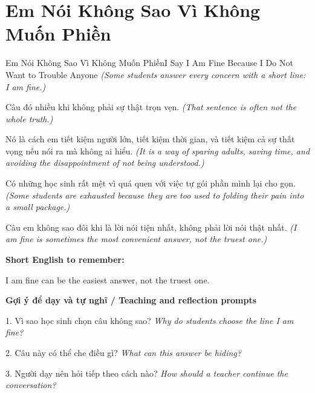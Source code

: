 \section{Em Nói Không Sao Vì Không Muốn Phiền}
\begin{truyen}{Em Nói Không Sao Vì Không Muốn Phiền}{I Say I Am Fine Because I Do Not Want to Trouble Anyone}
\textit{(Some students answer every concern with a short line: I am fine.)}

Câu đó nhiều khi không phải sự thật trọn vẹn.
\textit{(That sentence is often not the whole truth.)}

Nó là cách em tiết kiệm người lớn, tiết kiệm thời gian, và tiết kiệm cả sự thất vọng nếu nói ra mà không ai hiểu.
\textit{(It is a way of sparing adults, saving time, and avoiding the disappointment of not being understood.)}

Có những học sinh rất mệt vì quá quen với việc tự gói phần mình lại cho gọn.
\textit{(Some students are exhausted because they are too used to folding their pain into a small package.)}

\end{truyen}

\begin{baihoc}
Câu em không sao đôi khi là lời nói tiện nhất, không phải lời nói thật nhất.
\textit{(I am fine is sometimes the most convenient answer, not the truest one.)}
\end{baihoc}

\begin{ghinhoanh}
\textbf{Short English to remember:}

I am fine can be the easiest answer, not the truest one.

\end{ghinhoanh}

\begin{tuhocnhanh}
\textbf{Gợi ý để dạy và tự nghĩ / Teaching and reflection prompts}

1. Vì sao học sinh chọn câu không sao? \textit{Why do students choose the line I am fine?}

2. Câu này có thể che điều gì? \textit{What can this answer be hiding?}

3. Người dạy nên hỏi tiếp theo cách nào? \textit{How should a teacher continue the conversation?}
\end{tuhocnhanh}
\ngancach

